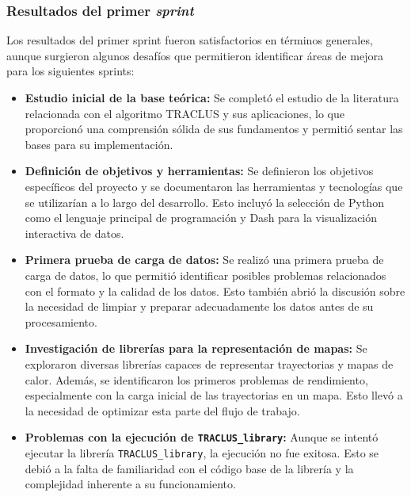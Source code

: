\subsubsection{Resultados del primer \textit{sprint}}

Los resultados del primer sprint fueron satisfactorios en términos generales, aunque surgieron algunos desafíos que permitieron identificar áreas de mejora para los siguientes sprints:

\begin{itemize}
    \item \textbf{Estudio inicial de la base teórica:} Se completó el estudio de la literatura relacionada con el algoritmo TRACLUS y sus aplicaciones, lo que proporcionó una comprensión sólida de sus fundamentos y permitió sentar las bases para su implementación.
    
    \item \textbf{Definición de objetivos y herramientas:} Se definieron los objetivos específicos del proyecto y se documentaron las herramientas y tecnologías que se utilizarían a lo largo del desarrollo. Esto incluyó la selección de Python como el lenguaje principal de programación y Dash para la visualización interactiva de datos.
    
    \item \textbf{Primera prueba de carga de datos:} Se realizó una primera prueba de carga de datos, lo que permitió identificar posibles problemas relacionados con el formato y la calidad de los datos. Esto también abrió la discusión sobre la necesidad de limpiar y preparar adecuadamente los datos antes de su procesamiento.
    
    \item \textbf{Investigación de librerías para la representación de mapas:} Se exploraron diversas librerías capaces de representar trayectorias y mapas de calor. Además, se identificaron los primeros problemas de rendimiento, especialmente con la carga inicial de las trayectorias en un mapa. Esto llevó a la necesidad de optimizar esta parte del flujo de trabajo.
    
    \item \textbf{Problemas con la ejecución de \texttt{TRACLUS\_library}:} Aunque se intentó ejecutar la librería \texttt{TRACLUS\_library}, la ejecución no fue exitosa. Esto se debió a la falta de familiaridad con el código base de la librería y la complejidad inherente a su funcionamiento.
\end{itemize}

